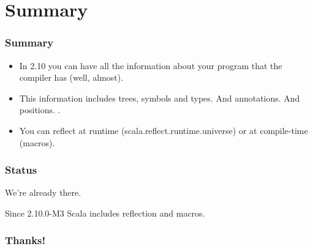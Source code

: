 \documentclass[hyperref={bookmarks=false}]{beamer}
\begin{document}
\section{Summary}

\begin{frame}[fragile]
\frametitle{Summary}

\begin{itemize}
\item In 2.10 you can have all the information about your program that the compiler has (well, almost).
\item This information includes trees, symbols and types. And annotations. And positions.
.
\item You can reflect at runtime (scala.reflect.runtime.universe) or at compile-time (macros).
\end{itemize}
\end{frame}

\begin{frame}[fragile]
\frametitle{Status}

We're already there.

Since 2.10.0-M3 Scala includes reflection and macros.

\end{frame}


\begin{frame}[fragile]
\frametitle{Thanks!}

\centering
{}

\end{frame}
\end{document}
